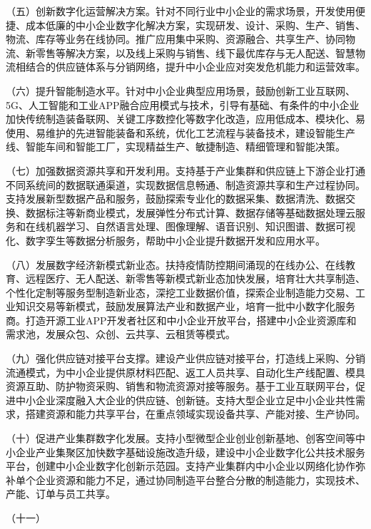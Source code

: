 （五）创新数字化运营解决方案。针对不同行业中小企业的需求场景，开发使用便捷、成本低廉的中小企业数字化解决方案，实现研发、设计、采购、生产、销售、物流、库存等业务在线协同。推广应用集中采购、资源融合、共享生产、协同物流、新零售等解决方案，以及线上采购与销售、线下最优库存与无人配送、智慧物流相结合的供应链体系与分销网络，提升中小企业应对突发危机能力和运营效率。

（六）提升智能制造水平。针对中小企业典型应用场景，鼓励创新工业互联网、5G、人工智能和工业APP融合应用模式与技术，引导有基础、有条件的中小企业加快传统制造装备联网、关键工序数控化等数字化改造，应用低成本、模块化、易使用、易维护的先进智能装备和系统，优化工艺流程与装备技术，建设智能生产线、智能车间和智能工厂，实现精益生产、敏捷制造、精细管理和智能决策。

（七）加强数据资源共享和开发利用。支持基于产业集群和供应链上下游企业打通不同系统间的数据联通渠道，实现数据信息畅通、制造资源共享和生产过程协同。支持发展新型数据产品和服务，鼓励探索专业化的数据采集、数据清洗、数据交换、数据标注等新商业模式，发展弹性分布式计算、数据存储等基础数据处理云服务和在线机器学习、自然语言处理、图像理解、语音识别、知识图谱、数据可视化、数字孪生等数据分析服务，帮助中小企业提升数据开发和应用水平。

（八）发展数字经济新模式新业态。扶持疫情防控期间涌现的在线办公、在线教育、远程医疗、无人配送、新零售等新模式新业态加快发展，培育壮大共享制造、个性化定制等服务型制造新业态，深挖工业数据价值，探索企业制造能力交易、工业知识交易等新模式，鼓励发展算法产业和数据产业，培育一批中小数字化服务商。打造开源工业APP开发者社区和中小企业开放平台，搭建中小企业资源库和需求池，发展众包、众创、云共享、云租赁等模式。

（九）强化供应链对接平台支撑。建设产业供应链对接平台，打造线上采购、分销流通模式，为中小企业提供原材料匹配、返工人员共享、自动化生产线配置、模具资源互助、防护物资采购、销售和物流资源对接等服务。基于工业互联网平台，促进中小企业深度融入大企业的供应链、创新链。支持大型企业立足中小企业共性需求，搭建资源和能力共享平台，在重点领域实现设备共享、产能对接、生产协同。

（十）促进产业集群数字化发展。支持小型微型企业创业创新基地、创客空间等中小企业产业集聚区加快数字基础设施改造升级，建设中小企业数字化公共技术服务平台，创建中小企业数字化创新示范园。支持产业集群内中小企业以网络化协作弥补单个企业资源和能力不足，通过协同制造平台整合分散的制造能力，实现技术、产能、订单与员工共享。

（十一）

